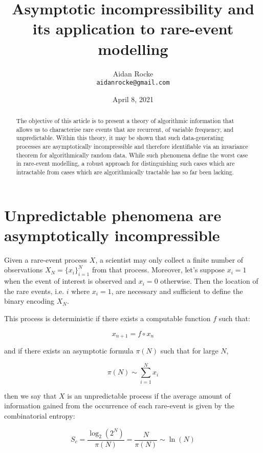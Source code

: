 \documentclass{article}
\title{Asymptotic incompressibility and its application to rare-event modelling}
\date{April 8, 2021}
\author{%
  Aidan Rocke\\
  \texttt{aidanrocke@gmail.com} \\
}
\begin{document}

\maketitle

\begin{abstract}
   The objective of this article is to present a theory of algorithmic information that allows us to characterise rare events that are recurrent, of variable frequency, and unpredictable. Within this theory, it may be shown that such data-generating processes are asymptotically incompressible and therefore identifiable via an invariance theorem for 
   algorithmically random data. While such phenomena define the worst case in rare-event modelling, a robust approach for distinguishing such cases which are intractable from cases which are algorithmically tractable has so far been lacking. 
   \end{abstract}

\section{Unpredictable phenomena are asymptotically incompressible}

Given a rare-event process $X$, a scientist may only collect a finite number of observations $X_N = \{x_i\}_{i=1}^N$ from that process. Moreover, let's suppose $x_i = 1$ when the event of interest is observed and $x_i=0$ otherwise. Then the location of the rare events, i.e. $i$ where $x_i=1$, are necessary and sufficient to define the binary encoding $X_N$.

This process is deterministic if there exists a computable function $f$ such that: 

\begin{equation}
x_{n+1} = f \circ x_n	
\end{equation}

and if there exists an asymptotic formula $\pi(N)$ such that for large $N$, 

\begin{equation}
\pi(N) \sim \sum_{i=1}^N x_i	
\end{equation}

then we say that $X$ is an unpredictable process if the average amount of information gained from the occurrence of each rare-event is given by the combinatorial entropy: 

\begin{equation}
S_c = \frac{\log_2 (2^N)}{\pi(N)} = \frac{N}{\pi(N)} \sim \ln(N)
\end{equation}
\end{document}
